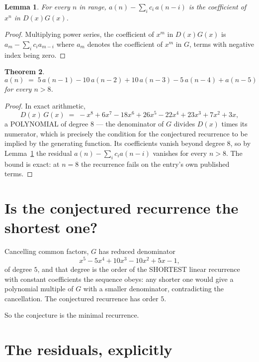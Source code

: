 \documentclass[11pt,a4paper]{article}
\theoremstyle{plain}
\newtheorem{theorem}{Theorem}
\newtheorem{lemma}[theorem]{Lemma}
\theoremstyle{definition}
\begin{document}
\begin{lemma}\label{lem:key}
For every $n$ in range, $a(n)-\sum_i c_i\,a(n-i)$ is the coefficient of $x^{n}$ in
$D(x)G(x)$.
\end{lemma}

\begin{proof}
Multiplying power series, the coefficient of $x^{m}$ in $D(x)G(x)$ is
$a_m-\sum_i c_i a_{m-i}$ where $a_m$ denotes the coefficient of $x^{m}$ in $G$, terms with
negative index being zero.
\end{proof}

\begin{theorem}
\[
a(n)\;=\;5\,a(n-1) - 10\,a(n-2) + 10\,a(n-3) - 5\,a(n-4) + a(n-5)
\]
for every $n>8$.
\end{theorem}

\begin{proof}
In exact arithmetic,
\[
D(x)\,G(x)\;=\;- x^{8} + 6 x^{7} - 18 x^{6} + 26 x^{5} - 22 x^{4} + 23 x^{3} + 7 x^{2} + 3 x,
\]
a POLYNOMIAL of degree $8$ --- the denominator of $G$ divides $D(x)$ times its numerator,
which is precisely the condition for the conjectured recurrence to be implied by the
generating function. Its coefficients vanish beyond degree $8$, so by
Lemma~\ref{lem:key} the residual $a(n)-\sum_ic_ia(n-i)$ vanishes for every
$n>8$. The bound is exact: at $n=8$ the recurrence fails on the entry's own published terms.
\end{proof}

\section{Is the conjectured recurrence the shortest one?}

Cancelling common factors, $G$ has reduced denominator
\[
x^{5} - 5 x^{4} + 10 x^{3} - 10 x^{2} + 5 x - 1,
\]
of degree $5$, and that degree is the order of the SHORTEST linear recurrence with
constant coefficients the sequence obeys: any shorter one would give a polynomial multiple of
$G$ with a smaller denominator, contradicting the cancellation. The conjectured recurrence has
order $5$.

So the conjecture is the minimal recurrence.

\section{The residuals, explicitly}
\end{document}
